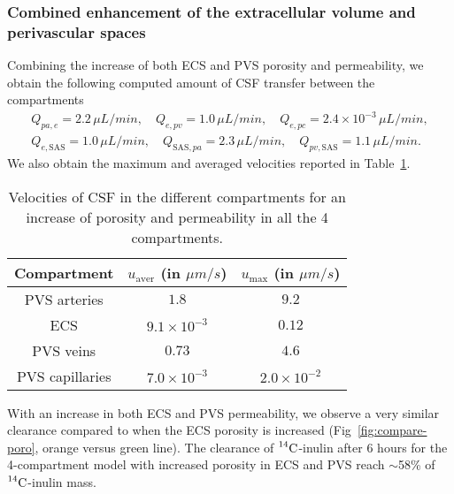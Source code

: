 \documentclass[a4paper,11pt]{article}
\newcommand{\1}{^{(1)}}
\newcommand{\2}{^{(2)}}
\newcommand{\Cinulin}{$\prescript{14}{}{\text{C}}$-inulin }
\begin{document}

\subsubsection{Combined enhancement of the extracellular volume and perivascular spaces}
\label{subsec:combined-res}


Combining the increase of both ECS and PVS porosity and permeability, we obtain the following computed amount of CSF transfer between the compartments
\[
\begin{aligned}
    Q_{pa,e} = 2.2 \, \si{\mu L/min},\quad Q_{e,pv} = 1.0 \,  \si{\mu L/min},\quad Q_{e,pc} = 2.4\times 10^{-3} \, \si{\mu L/min}, \\
    Q_{e,\text{SAS}} = 1.0 \, \si{\mu L/min} , \quad Q_{\text{SAS},pa} = 2.3 \, \si{\mu L/min},\quad Q_{pv,\text{SAS}} = 1.1 \, \si{\mu L/min}.
\end{aligned}
\]
We also obtain the maximum and averaged velocities reported in Table~\ref{tab:velocities-enhanced}. 



\begin{table}[h!]
    \centering
    \begin{tabular}{c|c|c}
       Compartment & $u_\text{aver}$ (in $\si{\mu m/s}$) & $u_\text{max}$ (in $\si{\mu m/s}$) \\
       \hline
    
        PVS arteries & $1.8$ & $9.2$ \\
        ECS &  $9.1 \times 10^{-3}$ & $0.12 $ \\
        PVS veins & $0.73$ & $4.6$ \\
        PVS capillaries & $7.0\times 10^{-3}$ & $2.0 \times 10^{-2}$
    \end{tabular}
    \caption{Velocities of CSF in the different compartments for an increase of porosity and permeability in all the 4 compartments.}
    \label{tab:velocities-enhanced}
\end{table}

With an increase in both ECS and PVS permeability, we observe a very similar clearance compared to when the ECS porosity is increased (Fig~\ref{fig:compare-poro}, orange versus green line). The clearance of \Cinulin after 6 hours for the 4-compartment model with increased porosity in ECS and PVS reach $\sim$58\% of \Cinulin mass. 
\end{document}
